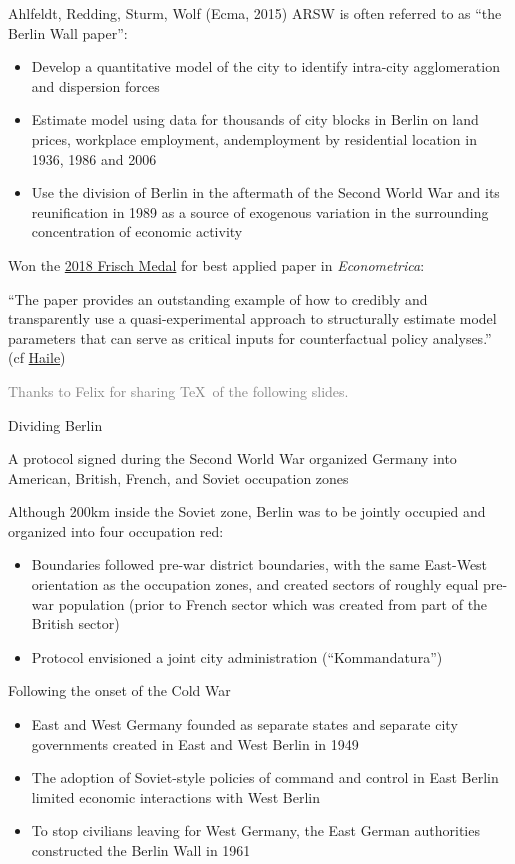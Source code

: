 \documentclass[10pt,notes=hide]{beamer}
\begin{document}
\begin{frame}{Ahlfeldt, Redding, Sturm, Wolf (Ecma, 2015)}
ARSW is often referred to as ``the Berlin Wall paper'':
\begin{itemize}
\item Develop a quantitative model of the city to identify intra-city agglomeration and dispersion forces
\item Estimate model using data for thousands of city blocks in Berlin on land prices, workplace employment, andemployment by residential location in 1936, 1986 and 2006
\item Use the division of Berlin in the aftermath of the Second World War and its reunification in 1989 as a source of exogenous variation in the surrounding concentration of economic activity
\end{itemize}
Won the \href{https://www.econometricsociety.org/society/awards}{2018 Frisch Medal} for best applied paper in \textit{Econometrica}:
{\small ``The paper provides an outstanding example of how to credibly and transparently use a quasi-experimental approach to structurally estimate model parameters that can serve as critical inputs for counterfactual policy analyses.''
(cf \href{https://www.dropbox.com/s/s6spj8wiruer4to/intro.pdf?dl=0}{Haile})\par}
{\small \textcolor{gray}{Thanks to Felix for sharing \TeX\ of the following slides.}}
\end{frame}
\begin{frame}{Dividing Berlin}
\begin{itemize}
{\small
\item A protocol signed during the Second World War organized Germany into American, British, French, and Soviet occupation zones
\item Although 200km inside the Soviet zone, Berlin was to be jointly occupied and organized into four occupation red:
\begin{itemize}
\item Boundaries followed pre-war district boundaries, with the same East-West orientation as the occupation zones, and created sectors of roughly equal pre-war population (prior to French sector which was created from part of the British sector)
  \item Protocol envisioned a joint city administration (``Kommandatura'')
    \end{itemize}
\item Following the onset of the Cold War
    \begin{itemize}
    \item East and West Germany founded as separate states and separate city governments created in East and West Berlin in 1949
    \item The adoption of Soviet-style policies of command and control in East Berlin limited economic interactions with West Berlin
    \item To stop civilians leaving for West Germany, the East German authorities constructed the Berlin Wall in 1961
    \end{itemize}
}
\end{itemize}
\end{frame}
\end{document}
